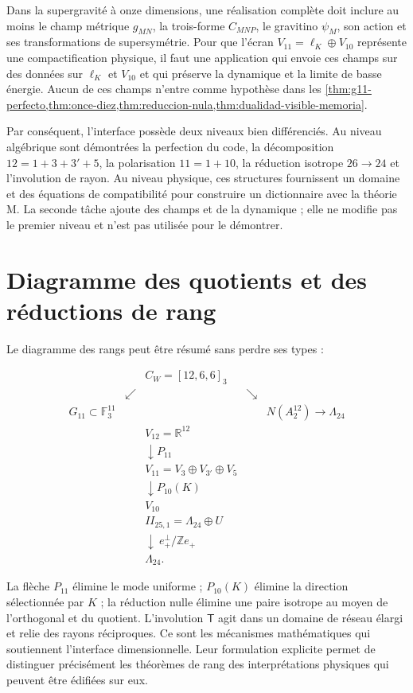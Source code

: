 Dans la supergravité à onze dimensions, une réalisation complète doit inclure
au moins le champ métrique \(g_{MN}\), la trois-forme \(C_{MNP}\), le
gravitino \(\psi_M\), son action et ses transformations de supersymétrie. Pour
que l'écran \(V_{11}=\ell_K\oplus V_{10}\) représente une compactification
physique, il faut une application qui envoie ces champs sur des données sur
\(\ell_K\) et \(V_{10}\) et qui préserve la dynamique et la limite de basse
énergie. Aucun de ces champs n'entre comme hypothèse dans les
\cref{thm:g11-perfecto,thm:once-diez,thm:reduccion-nula,thm:dualidad-visible-memoria}.

Par conséquent, l'interface possède deux niveaux bien différenciés. Au
niveau algébrique sont démontrées la perfection du code, la
décomposition \(12=1+3+3'+5\), la polarisation \(11=1+10\), la réduction
isotrope \(26\to24\) et l'involution de rayon. Au niveau physique, ces
structures fournissent un domaine et des équations de compatibilité pour
construire un dictionnaire avec la théorie M. La seconde tâche ajoute des champs et de la
dynamique ; elle ne modifie pas le premier niveau et n'est pas utilisée pour le démontrer.

\section{Diagramme des quotients et des réductions de rang}
\label{sec:sintesis-pantallas}

Le diagramme des rangs peut être résumé sans perdre ses types :

\[
\begin{array}{ccccc}
&&C_W=[12,6,6]_3&&\\[1mm]
&\swarrow&&\searrow&\\[-1mm]
G_{11}\subset\mathbb F_3^{11}&&&&N(A_2^{12})\longrightarrow\Lambda_{24}\\[2mm]
&&V_{12}=\mathbb R^{12}&&\\[-1mm]
&&\downarrow P_{11}&&\\[-1mm]
&&V_{11}=V_3\oplus V_{3'}\oplus V_5&&\\[-1mm]
&&\downarrow P_{10}(K)&&\\[-1mm]
&&V_{10}&&\\[2mm]
&&II_{25,1}=\Lambda_{24}\oplus U&&\\[-1mm]
&&\downarrow\ e_+^\perp/\mathbb Ze_+&&\\[-1mm]
&&\Lambda_{24}.&&
\end{array}
\]

La flèche \(P_{11}\) élimine le mode uniforme ; \(P_{10}(K)\) élimine la
direction sélectionnée par \(K\) ; la réduction nulle élimine une paire
isotrope au moyen de l'orthogonal et du quotient. L'involution
\(\mathsf T\) agit dans un domaine de réseau élargi et relie des rayons
réciproques. Ce sont les mécanismes mathématiques qui soutiennent l'interface
dimensionnelle. Leur formulation explicite permet de distinguer précisément les
théorèmes de rang des interprétations physiques qui peuvent être édifiées
sur eux.
